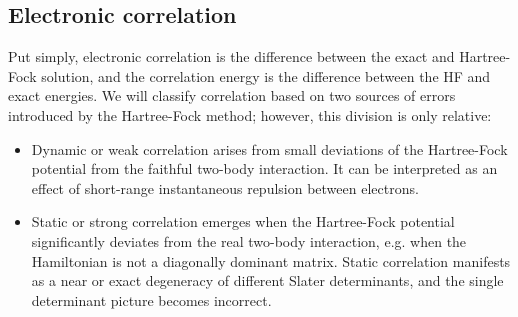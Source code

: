 \subsection{Electronic correlation
\label{sec:electronic_correlation}}

Put simply, electronic correlation is the difference between the exact and 
Hartree-Fock solution, and the correlation energy is the difference between 
the HF and exact energies. We will classify correlation based on two 
sources of errors introduced by the Hartree-Fock method; however, this division 
is only relative:

\begin{itemize}
\item Dynamic or weak correlation arises from small deviations of 
the Hartree-Fock potential from the faithful two-body interaction. It can be 
interpreted as an effect of short-range instantaneous repulsion between 
electrons.
\item Static or strong correlation emerges when the Hartree-Fock potential 
significantly deviates from the real two-body interaction, e.g. when the 
Hamiltonian is not a diagonally dominant matrix. Static correlation 
manifests as a near or exact degeneracy of different Slater determinants, and 
the single determinant picture becomes incorrect.
\end{itemize}

